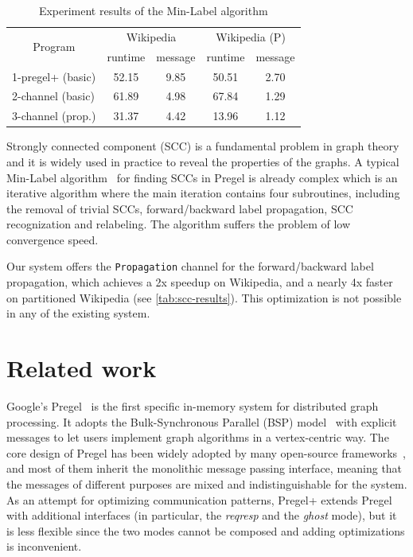 \documentclass{sokendai_thesis} %
\newcommand{\PP}{Pregel+}
\begin{document}
\begin{table}[t]
\centering
\caption{Experiment results of the Min-Label algorithm}
\label{tab:scc-results}
\begin{tabular}{l|c|c|c|c}
\hline
\multicolumn{1}{c}{\multirow{2}{*}{Program}} & \multicolumn{2}{|c}{Wikipedia} & \multicolumn{2}{|c}{Wikipedia (P)} \\
\cline{2-5}
& \small runtime & \small message & \small runtime & \small message \\
\hline\hline
1-pregel+ (basic) & 52.15 & 9.85  & 50.51 & 2.70  \\
\hline
2-channel (basic) & 61.89 & 4.98  & 67.84 & 1.29  \\
\hline
3-channel (prop.) & 31.37 & 4.42  & 13.96 & 1.12  \\
\hline
\end{tabular}
\end{table}

Strongly connected component (SCC) is a fundamental problem in graph theory and it is widely used in practice to reveal the properties of the graphs.
A typical Min-Label algorithm~\cite{yan2015effective} for finding SCCs in Pregel is already complex which is an iterative algorithm where the main iteration contains four subroutines, including the removal of trivial SCCs, forward/backward label propagation, SCC recognization and relabeling.
The algorithm suffers the problem of low convergence speed.

Our system offers the \texttt{Propagation} channel for the forward/backward label propagation, which achieves a 2x speedup on Wikipedia, and a nearly 4x faster on partitioned Wikipedia (see \autoref{tab:scc-results}).
This optimization is not possible in any of the existing system.

\section{Related work}

Google's Pregel~\cite{pregel} is the first specific in-memory system for distributed graph processing.
It adopts the Bulk-Synchronous Parallel (BSP) model~\cite{bsp} with explicit messages to let users implement graph algorithms in a vertex-centric way.
The core design of Pregel has been widely adopted by many open-source frameworks~\cite{survey, survey2}, and most of them inherit the monolithic message passing interface, meaning that the messages of different purposes are mixed and indistinguishable for the system.
As an attempt for optimizing communication patterns,
\PP{} extends Pregel with additional interfaces (in particular, the \emph{reqresp} and the \emph{ghost} mode), but it is less flexible since the two modes cannot be composed and adding optimizations is inconvenient.
\end{document}
